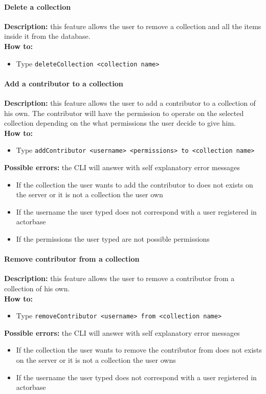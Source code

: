 \documentclass{scalatekids-article}
\begin{document}
\paragraph{Delete a collection}
\label{sec:deletecollection}
\textbf{Description:} this feature allows the user to remove a collection and all the items inside it from the database.\\
\textbf{How to:} 
\begin{itemize}
	\item Type \texttt{deleteCollection <collection name>}
\end{itemize}

\paragraph{Add a contributor to a collection}
\label{sec:addcontributor}
\textbf{Description:} this feature allows the user to add a contributor 
to a collection of his own. The contributor will have the permission to operate on the selected collection depending on the what permissions the user decide to give him.\\
\textbf{How to:} 
\begin{itemize}
	\item Type \texttt{addContributor <username> <permissions> to <collection name>}
\end{itemize}
\textbf{Possible errors:} the CLI will answer with self explanatory error messages 
\begin{itemize}
	\item If the collection the user wants to add the contributor to does not exists on the server or it is not a collection the user own
	\item If the username the user typed does not correspond with a user registered in actorbase
	\item If the permissions the user typed are not possible permissions
\end{itemize}

\paragraph{Remove contributor from a collection}
\label{sec:removecontributor}
\textbf{Description:} this feature allows the user to remove a contributor from a collection of his own.\\
\textbf{How to:} 
\begin{itemize}
	\item Type \texttt{removeContributor <username> from <collection name>}
\end{itemize}
\textbf{Possible errors:} the CLI will answer with self explanatory error messages 
\begin{itemize}
	\item If the collection the user wants to remove the contributor from does not exists on the server or it is not a collection the user owns
	\item If the username the user typed does not correspond with a user registered in actorbase
\end{itemize}
\end{document}
